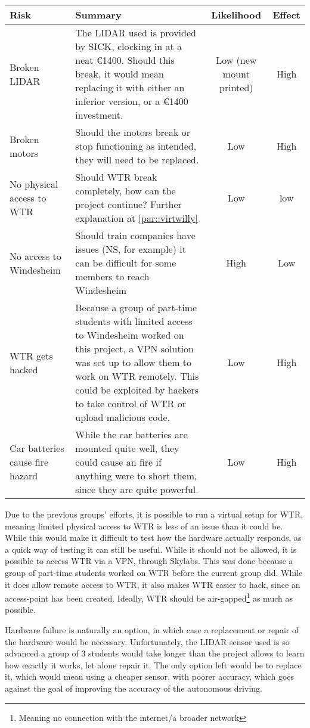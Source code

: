 \begin{tabular}{|L{3cm}|L{6cm}|c|c|}
\hline
Risk			 	& Summary			& Likelihood 		& Effect \\ \hline
Broken LIDAR 	& The LIDAR used is provided by SICK, clocking in at a neat \euro 1400. Should this break, it would mean replacing it with either an inferior version, or a \euro 1400 investment. & Low (new mount printed) & High \\ \hline
Broken motors 	& Should the motors break or stop functioning as intended, they will need to be replaced. & Low & High \\ \hline
No physical access to WTR & Should WTR break completely, how can the project continue? Further explanation at \ref{par::virtwilly} & Low & low \\ \hline
No access to Windesheim & Should train companies have issues (NS, for example) it can be difficult for some members to reach Windesheim & 
High & Low \\ \hline
WTR gets hacked  & Because a group of part-time students with limited access to Windesheim worked on this project, a VPN solution was set up to allow them to work on WTR remotely. This could be exploited by hackers to take control of WTR or upload malicious code. & Low  & High \\ \hline
Car batteries cause fire hazard & While the car batteries are mounted quite well, they could cause an fire if anything were to short them, since they are quite powerful. & Low & High \\ \hline

\end{tabular}

Due to the previous groups' efforts, it is possible to run a virtual setup for WTR, meaning limited physical access to WTR is less of an issue than it could be\label{par::virtwilly}.
While this would make it difficult to test how the hardware actually responds, as a quick way of testing it can still be useful.
While it should not be allowed, it is possible to access WTR via a VPN, through Skylabs.
This was done because a group of part-time students worked on WTR before the current group did.
While it does allow remote access to WTR, it also makes WTR easier to hack, since an access-point has been created.
Ideally, WTR should be air-gapped\footnote{Meaning no connection with the internet/a broader network} as much as possible.

Hardware failure is naturally an option, in which case a replacement or repair of the hardware would be necessary.
Unfortunately, the LIDAR sensor used is so advanced a group of 3 students would take longer than the project allows to learn how exactly it works, let alone repair it.
The only option left would be to replace it, which would mean using a cheaper sensor, with poorer accuracy, which goes against the goal of improving the accuracy of the autonomous driving.

